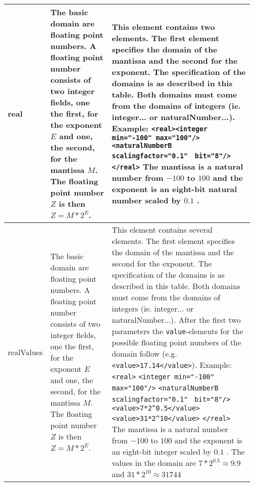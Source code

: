 \begin{center}
\begin{longtable}{|p{25mm}|p{25mm}|p{75mm}|}
	real & The basic domain are floating point numbers. A floating point number consists of two integer fields, one the first, for the exponent $E$ and one, the second, for the mantissa $M$. The floating point number $Z$ is then $Z = M * 2^E$. & This element contains two elements. The first element specifies the domain of the mantissa and the second for the exponent. The specification of the domains is as described in this table. Both domains must come from the domains of integers (ie. integer... or naturalNumber...). Example: \verb|<real>|\newline \verb|<integer min="-100" max="100"/>| \verb|<naturalNumberB| \verb|scalingfactor="0.1"| \verb| bit="8"/></real>| The mantissa is a natural number from $-100$ to $100$ and the exponent is an eight-bit natural number scaled by $0.1$ .\\\hline
	realValues & The basic domain are floating point numbers. A floating point number consists of two integer fields, one the first, for the exponent $E$ and one, the second, for the mantissa $M$. The floating point number $Z$ is then $Z = M * 2^E$. & This element contains several elements. The first element specifies the domain of the mantissa and the second for the exponent. The specification of the domains is as described in this table. Both domains must come from the domains of integers (ie. integer... or naturalNumber...). After the first two parameters the \verb|value|-elements for the possible floating point numbers of the domain follow (e.g. \verb|<value>17.14</value>|). Example: \verb|<real>| \verb|<integer min="-100"| \verb|max="100"/>| \verb|<naturalNumberB| \verb|scalingfactor="0.1"| \verb| bit="8"/>| \verb|<value>7*2^0.5</value>| \verb|<value>31*2^10</value>| \verb|</real>| The mantissa is a natural number from $-100$ to $100$ and the exponent is an eight-bit integer scaled by $0.1$ . The values in the domain are $7*2^{0.5} \approx 9.9$ and $31*2^{10} \approx 31744$\\\hline


\end{longtable}
\end{center}
